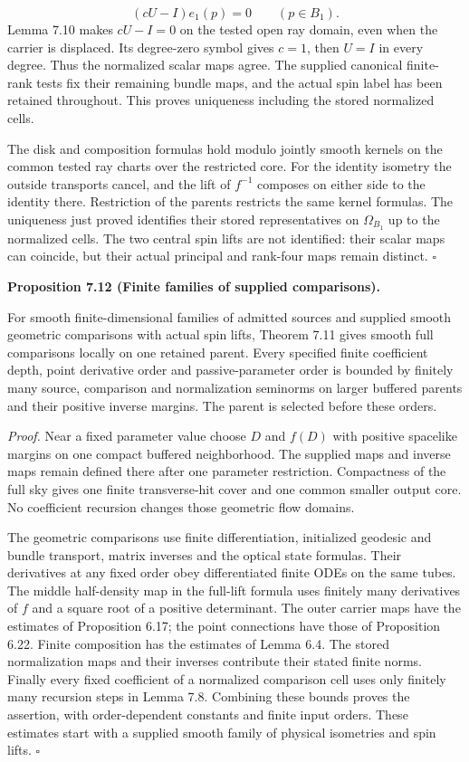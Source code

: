 \documentclass[
  english,
  11pt,
  reqno]{amsart}
\makeatletter
\newcommand{\pandocstatementheading}[1]{%
  \par\addpenalty{\@beginparpenalty}%
  \addvspace{.5\baselineskip plus .2\baselineskip minus .2\baselineskip}%
  {\normalfont\bfseries #1\par}%
  \nobreak\@afterindenttrue\@afterheading
}
\makeatother
\begin{document}
\label{eq:online-full-source-uniqueness-family-test} \[
(cU-I)e_1(p)=0\qquad(p\in B_1).
\] Lemma 7.10 makes \(cU-I=0\) on the tested open ray domain, even when
the carrier is displaced. Its degree-zero symbol gives \(c=1\), then
\(U=I\) in every degree. Thus the normalized scalar maps agree. The
supplied canonical finite-rank tests fix their remaining bundle maps,
and the actual spin label has been retained throughout. This proves
uniqueness including the stored normalized cells.

The disk and composition formulas hold modulo jointly smooth kernels on
the common tested ray charts over the restricted core. For the identity
isometry the outside transports cancel, and the lift of \(f^{-1}\)
composes on either side to the identity there. Restriction of the
parents restricts the same kernel formulas. The uniqueness just proved
identifies their stored representatives on \(\Omega_{B_1}\) up to the
normalized cells. The two central spin lifts are not identified: their
scalar maps can coincide, but their actual principal and rank-four maps
remain distinct. \hfill\(\square\)

\pandocstatementheading{\leavevmode{}\label{prop:online-full-comparison-finite-families}Proposition 7.12 (Finite families of supplied comparisons).}

For smooth finite-dimensional families of admitted sources and supplied
smooth geometric comparisons with actual spin lifts, Theorem 7.11 gives
smooth full comparisons locally on one retained parent. Every specified
finite coefficient depth, point derivative order and passive-parameter
order is bounded by finitely many source, comparison and normalization
seminorms on larger buffered parents and their positive inverse margins.
The parent is selected before these orders.

\emph{Proof.} Near a fixed parameter value choose \(D\) and \(f(D)\)
with positive spacelike margins on one compact buffered neighborhood.
The supplied maps and inverse maps remain defined there after one
parameter restriction. Compactness of the full sky gives one finite
transverse-hit cover and one common smaller output core. No coefficient
recursion changes those geometric flow domains.

The geometric comparisons use finite differentiation, initialized
geodesic and bundle transport, matrix inverses and the optical state
formulas. Their derivatives at any fixed order obey differentiated
finite ODEs on the same tubes. The middle half-density map in the
full-lift formula uses finitely many derivatives of \(f\) and a square
root of a positive determinant. The outer carrier maps have the
estimates of Proposition 6.17; the point connections have those of
Proposition 6.22. Finite composition has the estimates of Lemma 6.4. The
stored normalization maps and their inverses contribute their stated
finite norms. Finally every fixed coefficient of a normalized comparison
cell uses only finitely many recursion steps in Lemma 7.8. Combining
these bounds proves the assertion, with order-dependent constants and
finite input orders. These estimates start with a supplied smooth family
of physical isometries and spin lifts. \hfill\(\square\)
\end{document}
